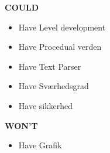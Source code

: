 \textbf{COULD}

\begin{itemize}

\item Have Level development
\item Have Procedual verden
\item Have Text Parser
\item Have Sværhedsgrad
\item Have sikkerhed

\end{itemize}

\textbf{WON'T}
\begin{itemize}
\item Have Grafik
\end{itemize}

 